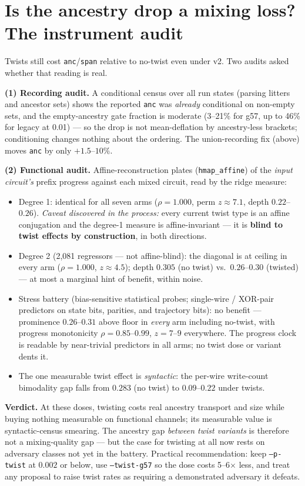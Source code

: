 \documentclass[11pt]{article}
\newcommand{\code}[1]{\texttt{#1}}
\begin{document}
\section{Is the ancestry drop a mixing loss? The instrument audit}

Twists still cost \code{anc}/\code{span} relative to no-twist even under v2.
Two audits asked whether that reading is real.

\textbf{(1) Recording audit.} A conditional census over all run states
(parsing litters and ancestor sets) shows the reported \code{anc} was
\emph{already} conditional on non-empty sets, and the empty-ancestry gate
fraction is moderate (3--21\% for g57, up to 46\% for legacy at 0.01) --- so
the drop is not mean-deflation by ancestry-less brackets; conditioning
changes nothing about the ordering. The union-recording fix (above) moves
\code{anc} by only $+1.5$--$10\%$.

\textbf{(2) Functional audit.} Affine-reconstruction plates
(\code{hmap\_affine}) of the \emph{input circuit's} prefix progress against
each mixed circuit, read by the ridge measure:
\begin{itemize}
\item Degree 1: identical for all seven arms ($\rho = 1.000$, perm
$z \approx 7.1$, depth $0.22$--$0.26$). \emph{Caveat discovered in the
process:} every current twist type is an affine conjugation and the degree-1
measure is affine-invariant --- it is \textbf{blind to twist effects by
construction}, in both directions.
\item Degree 2 (2{,}081 regressors --- not affine-blind): the diagonal is at
ceiling in every arm ($\rho = 1.000$, $z \approx 4.5$); depth $0.305$
(no twist) vs.\ $0.26$--$0.30$ (twisted) --- at most a marginal hint of
benefit, within noise.
\item Stress battery (bias-sensitive statistical probes; single-wire /
XOR-pair predictors on state bits, parities, and trajectory bits): no
benefit --- prominence $0.26$--$0.31$ above floor in \emph{every} arm
including no-twist, with progress monotonicity $\rho = 0.85$--$0.99$,
$z = 7$--$9$ everywhere. The progress clock is readable by near-trivial
predictors in all arms; no twist dose or variant dents it.
\item The one measurable twist effect is \emph{syntactic}: the per-wire
write-count bimodality gap falls from $0.283$ (no twist) to $0.09$--$0.22$
under twists.
\end{itemize}

\textbf{Verdict.} At these doses, twisting costs real ancestry transport and
size while buying nothing measurable on functional channels; its measurable
value is syntactic-census smearing. The ancestry gap \emph{between twist
variants} is therefore not a mixing-quality gap --- but the case for twisting
at all now rests on adversary classes not yet in the battery. Practical
recommendation: keep \code{--p-twist} at $0.002$ or below, use
\code{--twist-g57} so the dose costs 5--6$\times$ less, and treat any
proposal to raise twist rates as requiring a demonstrated adversary it
defeats.
\end{document}
